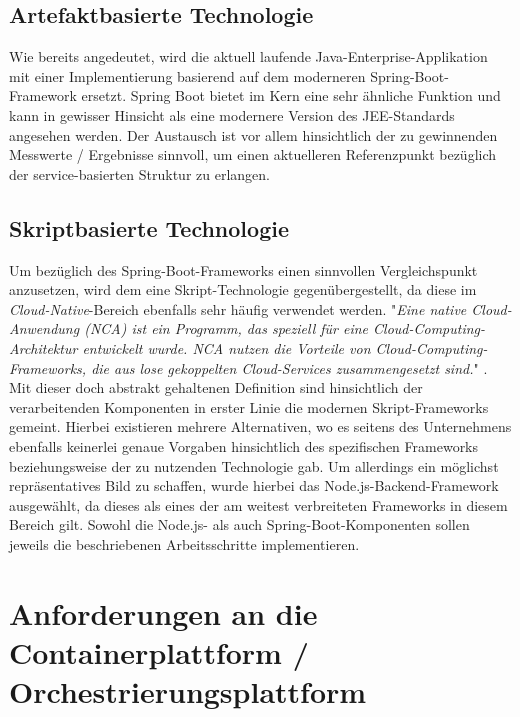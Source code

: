 \subsection{Artefaktbasierte Technologie}
Wie bereits angedeutet, wird die aktuell laufende Java-Enterprise-Applikation mit einer Implementierung basierend auf dem moderneren Spring-Boot-Framework ersetzt. Spring Boot bietet im Kern eine sehr ähnliche Funktion und kann in gewisser Hinsicht als eine modernere Version des JEE-Standards angesehen werden. Der Austausch ist vor allem hinsichtlich der zu gewinnenden Messwerte / Ergebnisse sinnvoll, um einen aktuelleren Referenzpunkt bezüglich der service-basierten Struktur zu erlangen.

\subsection{Skriptbasierte Technologie}


Um bezüglich des Spring-Boot-Frameworks einen sinnvollen Vergleichspunkt anzusetzen, wird dem eine Skript-Technologie gegenübergestellt, da diese im \emph{Cloud-Native}-Bereich ebenfalls sehr häufig verwendet werden. "\emph{Eine native Cloud-Anwendung (NCA) ist ein Programm, das speziell für eine Cloud-Computing-Architektur entwickelt wurde. NCA nutzen die Vorteile von Cloud-Computing-Frameworks, die aus lose gekoppelten Cloud-Services zusammengesetzt sind.}" \cite{def-nca}. Mit dieser doch abstrakt gehaltenen Definition sind hinsichtlich der verarbeitenden Komponenten in erster Linie die modernen Skript-Frameworks gemeint. Hierbei existieren mehrere Alternativen, wo es seitens des Unternehmens ebenfalls keinerlei genaue Vorgaben hinsichtlich des spezifischen Frameworks beziehungsweise der zu nutzenden Technologie gab. Um allerdings ein möglichst repräsentatives Bild zu schaffen, wurde hierbei das Node.js-Backend-Framework ausgewählt, da dieses als eines der am weitest verbreiteten Frameworks in diesem Bereich gilt. Sowohl die Node.js- als auch Spring-Boot-Komponenten sollen jeweils die beschriebenen Arbeitsschritte implementieren.


\section{Anforderungen an die Containerplattform / Orchestrierungsplattform}
\label{sec:anforderungPlattform}

